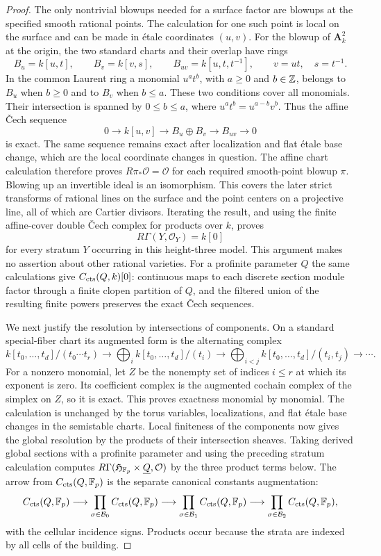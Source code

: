 \begin{proof}
The only nontrivial blowups needed for a surface factor are blowups
at the specified smooth rational points.  The calculation for one
such point is local on the surface and can be made in étale
coordinates $(u,v)$.  For the blowup of $\mathbf A^2_k$ at the
origin, the two standard charts and their overlap have rings
\[
 B_u=k[u,t],\qquad B_v=k[v,s],\qquad
 B_{uv}=k[u,t,t^{-1}],\qquad v=ut,\quad s=t^{-1}.
\]
In the common Laurent ring a monomial $u^a t^b$, with $a\geq0$ and
$b\in\mathbb Z$, belongs to $B_u$ when $b\geq0$ and to $B_v$ when $b\leq a$.
These two conditions cover all monomials.  Their intersection is
spanned by $0\leq b\leq a$, where
$u^a t^b=u^{a-b}v^b$.  Thus the affine Čech sequence
\[
 0\longrightarrow k[u,v]\longrightarrow B_u\oplus B_v
   \longrightarrow B_{uv}\longrightarrow0
\]
is exact.  The same sequence remains exact after localization and
flat étale base change, which are the local coordinate changes in
question.  The affine chart calculation therefore proves
$R\pi_*\mathcal O=\mathcal O$ for each required smooth-point blowup
$\pi$.  Blowing up an invertible ideal is an isomorphism.  This covers
the later strict transforms of rational lines on the surface and
the point centers on a projective line, all of which are Cartier
divisors.  Iterating the result, and using the finite affine-cover
double Čech complex for products over $k$, proves
\[
 R\Gamma(Y,\mathcal O_Y)=k[0]
\]
for every stratum $Y$ occurring in this height-three model.  This
argument makes no assertion about other rational varieties.
For a profinite parameter $Q$ the same calculations give
$C_{\mathrm{cts}}(Q,k)[0]$: continuous maps to each discrete section
module factor through a finite clopen partition of $Q$, and the
filtered union of the resulting finite powers preserves the exact
Čech sequences.

We next justify the resolution by intersections of components.
On a standard special-fiber chart its augmented form is the
alternating complex
\[
 k[t_0,\ldots,t_d]/(t_0\cdots t_r)
 \longrightarrow \bigoplus_i k[t_0,\ldots,t_d]/(t_i)
 \longrightarrow \bigoplus_{i<j} k[t_0,\ldots,t_d]/(t_i,t_j)
 \longrightarrow\cdots .
\]
For a nonzero monomial, let $Z$ be the nonempty set of indices
$i\leq r$ at which its exponent is zero.  Its coefficient complex
is the augmented cochain complex of the simplex on $Z$, so it is
exact.  This proves exactness monomial by monomial.  The calculation
is unchanged by the torus variables, localizations, and flat étale
base changes in the semistable charts.  Local finiteness of the
components now gives the global resolution by the products of their
intersection sheaves.  Taking derived global sections with a
profinite parameter and using the preceding stratum calculation
computes $R\Gamma(\mathfrak H_{\mathbb F_p}\times\underline Q,\mathcal O)$
by the three product terms below.  The arrow from
$C_{\mathrm{cts}}(Q,\mathbb F_p)$ is the separate canonical constants
augmentation:
\[
 C_{\mathrm{cts}}(Q,\mathbb F_p)\longrightarrow
 \prod_{\sigma\in\mathcal B_0}C_{\mathrm{cts}}(Q,\mathbb F_p)
 \longrightarrow
 \prod_{\sigma\in\mathcal B_1}C_{\mathrm{cts}}(Q,\mathbb F_p)
 \longrightarrow
 \prod_{\sigma\in\mathcal B_2}C_{\mathrm{cts}}(Q,\mathbb F_p),
\]
with the cellular incidence signs.  Products occur because the
strata are indexed by all cells of the building.


\end{proof}
